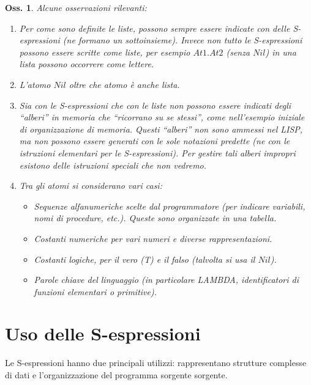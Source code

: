 \documentclass{book}
\newtheorem{osservazione}{Oss.}[chapter]
\begin{document}
\begin{osservazione} Alcune osservazioni rilevanti:
\begin{enumerate}
\item[-]Per come sono definite le liste, possono sempre essere indicate con 
delle  S-espressioni (ne formano un sottoinsieme). Invece non tutto le 
S-espressioni possono essere scritte come liste, per esempio $At1.At2$ 
(senza $Nil$) in una lista possono occorrere come lettere.
\item[-]L'atomo $Nil$ oltre che atomo \`e anche lista.
\item[-]Sia con le S-espressioni che con le liste non possono essere indicati
degli ``alberi'' in memoria che ``ricorrano su se stessi'', come nell'esempio
iniziale di organizzazione di memoria. Questi ``alberi'' non sono ammessi nel
LISP, ma non possono essere generati con le sole notazioni predette (ne con
le istruzioni elementari per le S-espressioni). Per gestire tali alberi
impropri esistono delle istruzioni speciali che non vedremo.
\item[-]Tra gli atomi si considerano vari casi: 
\begin{itemize}
\item Sequenze alfanumeriche scelte dal programmatore (per indicare 
variabili, nomi di procedure, etc.). Queste sono organizzate in una tabella.
\item Costanti numeriche per vari numeri e diverse rappresentazioni.
\item Costanti logiche, per il vero (T) e il falso (talvolta si usa il 
$Nil$).
\item Parole chiave del linguaggio (in particolare LAMBDA, identificatori 
di funzioni elementari o primitive).
\end{itemize}
\end{enumerate}
\end{osservazione}

\section{Uso delle S-espressioni}
Le S-espressioni hanno due principali utilizzi: rappresentano strutture 
complesse di dati e l'organizzazione del programma sorgente sorgente.
\end{document}
